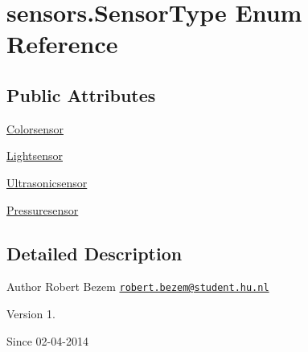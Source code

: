 \hypertarget{enumsensors_1_1_sensor_type}{\section{sensors.\-Sensor\-Type Enum Reference}
\label{enumsensors_1_1_sensor_type}
}
\subsection*{Public Attributes}
\begin{DoxyCompactItemize}
\item 
\hyperlink{enumsensors_1_1_sensor_type_a56c9a2b279f1d909323b79f8ef272ff7}{Colorsensor}
\item 
\hyperlink{enumsensors_1_1_sensor_type_a6438e9ee7c60fcd103234e28e986c1ea}{Lightsensor}
\item 
\hyperlink{enumsensors_1_1_sensor_type_a850fa290a12e42dafa929ff12bdcf574}{Ultrasonicsensor}
\item 
\hyperlink{enumsensors_1_1_sensor_type_ad4009ea0d42269e90107270a4eaeb372}{Pressuresensor}
\end{DoxyCompactItemize}


\subsection{Detailed Description}
\begin{DoxyAuthor}{Author}
Robert Bezem \href{mailto:robert.bezem@student.hu.nl}{\tt robert.\-bezem@student.\-hu.\-nl} 
\end{DoxyAuthor}
\begin{DoxyVersion}{Version}
1. 
\end{DoxyVersion}
\begin{DoxySince}{Since}
02-\/04-\/2014 
\end{DoxySince}


